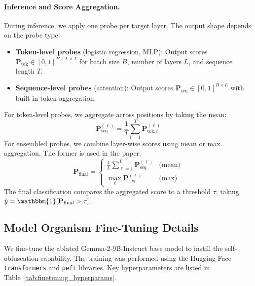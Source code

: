 \documentclass{article} %
\begin{document}
\paragraph{Inference and Score Aggregation.}
\label{app:aggregation}
During inference, we apply one probe per target layer. The output shape depends on the probe type:
\begin{itemize}
    \item \textbf{Token-level probes} (logistic regression, MLP): Output scores $\mathbf{P}_{\text{tok}} \in [0,1]^{B \times L \times T}$ for batch size $B$, number of layers $L$, and sequence length $T$.
    \item \textbf{Sequence-level probes} (attention): Output scores $\mathbf{P}_{\text{seq}} \in [0,1]^{B \times L}$ with built-in token aggregation.
\end{itemize}

For token-level probes, we aggregate across positions by taking the mean:
\begin{equation}
\mathbf{P}_{\text{seq}}^{(\ell)} = \frac{1}{T} \sum_{t=1}^T \mathbf{P}_{\text{tok},t}^{(\ell)}
\end{equation}
For ensembled probes, we combine layer-wise scores using mean or max aggregation. The former is used in the paper:
\begin{equation}
\mathbf{P}_{\text{final}} = \begin{cases}
\frac{1}{L} \sum_{\ell=1}^L \mathbf{P}_{\text{seq}}^{(\ell)} & \text{(mean)} \\
\max_{\ell} \mathbf{P}_{\text{seq}}^{(\ell)} & \text{(max)}
\end{cases}
\end{equation}
The final classification compares the aggregated score to a threshold $\tau$, taking $\hat{y} = \mathbbm{1}[\mathbf{P}_{\text{final}} > \tau]$.

\subsection{Model Organism Fine-Tuning Details}
\label{app:finetuning}

We fine-tune the ablated Gemma-2-9B-Instruct base model to instill the self-obfuscation capability. The training was performed using the Hugging Face \texttt{transformers} and \texttt{peft} libraries. Key hyperparameters are listed in Table~\ref{tab:finetuning_hyperparams}.
\end{document}

